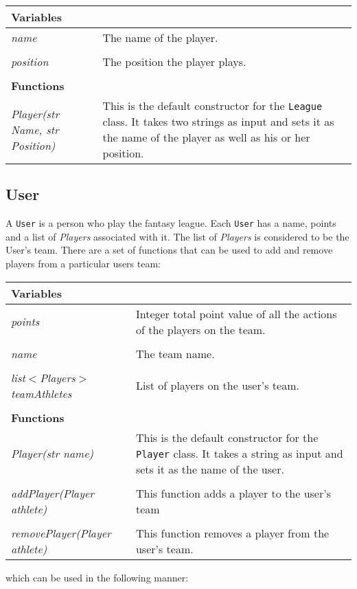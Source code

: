\documentclass[12pt]{report}
\begin{document}
\begin{doublespace}
\begin{flushleft}
\begin{onehalfspace}
\begin{tabular}{ l | p{10cm} }
\hline
\textbf{Variables} & \\
\hline
\textit{name} & The name of the player. \\
\\
\textit{position} & The position the player plays. \\
\\
\hline
\textbf{Functions} & \\
\hline
\textit{Player(str Name, str Position)} & This is the default constructor for the \texttt{League} class. It takes two strings as input and sets it as the name of the player as well as his or her position. \\
\hline
\end{tabular}
\end{onehalfspace}
\end{flushleft}

\subsection{User}
A \texttt{User} is a person who play the fantasy league. Each \texttt{User} has a name, points and a list of \textit{Players} associated with it. The list of \textit{Players} is considered to be the User's team. There are a set of functions that can be used to add and remove players from a particular users team:

\begin{flushleft}
\begin{onehalfspace}
\begin{tabular}{ p{5.5cm} | p{10cm} }
\hline
\textbf{Variables} & \\
\hline
\textit{points} & Integer total point value of all the actions of the players on the team. \\
\\
\textit{name} & The team name. \\
\\
\textit{list$<$Players$>$ teamAthletes} & List of players on the user's team. \\
\\
\hline
\textbf{Functions} & \\
\hline
\textit{Player(str name)} & This is the default constructor for the \texttt{Player} class. It takes a string as input and sets it as the name of the user. \\
\\
\textit{addPlayer(Player athlete)} & This function adds a player to the user's team \\
\\
\textit{removePlayer(Player athlete)} & This function removes a player from the user's team. \\
\hline
\end{tabular}
\end{onehalfspace}
\end{flushleft}
which can be used in the following manner:
\end{doublespace}
\end{document}
